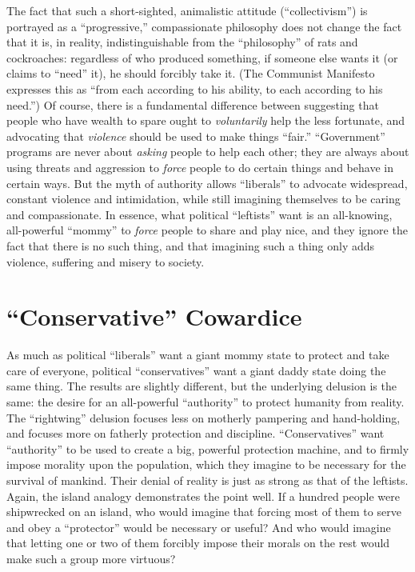 \documentclass{book}
\begin{document}
The fact that such a short-sighted, animalistic attitude (\enquote{collectivism}) is portrayed as a \enquote{progressive,} compassionate philosophy does not change the fact that it is, in reality, indistinguishable from the \enquote{philosophy} of rats and cockroaches: regardless of who produced something, if someone else wants it (or claims to \enquote{need} it), he should forcibly take it. (The Communist Manifesto expresses this as \enquote{from each according to his ability, to each according to his need.}) Of course, there is a fundamental difference between suggesting that people who have wealth to spare ought to \emph{voluntarily} help the less fortunate, and advocating that \emph{violence} should be used to make things \enquote{fair.} \enquote{Government} programs are never about \emph{asking} people to help each other; they are always about using threats and aggression to \emph{force} people to do certain things and behave in certain ways. But the myth of authority allows \enquote{liberals} to advocate widespread, constant violence and intimidation, while still imagining themselves to be caring and compassionate. In essence, what political \enquote{leftists} want is an all-knowing, all-powerful \enquote{mommy} to \emph{force} people to share and play nice, and they ignore the fact that there is no such thing, and that imagining such a thing only adds violence, suffering and misery to society.

\section{\enquote{Conservative} Cowardice}

As much as political \enquote{liberals} want a giant mommy state to protect and take care of everyone, political \enquote{conservatives} want a giant daddy state doing the same thing. The results are slightly different, but the underlying delusion is the same: the desire for an all-powerful \enquote{authority} to protect humanity from reality. The \enquote{rightwing} delusion focuses less on motherly pampering and hand-holding, and focuses more on fatherly protection and discipline. \enquote{Conservatives} want \enquote{authority} to be used to create a big, powerful protection machine, and to firmly impose morality upon the population, which they imagine to be necessary for the survival of mankind. Their denial of reality is just as strong as that of the leftists. Again, the island analogy demonstrates the point well. If a hundred people were shipwrecked on an island, who would imagine that forcing most of them to serve and obey a \enquote{protector} would be necessary or useful? And who would imagine that letting one or two of them forcibly impose their morals on the rest would make such a group more virtuous?
\end{document}
